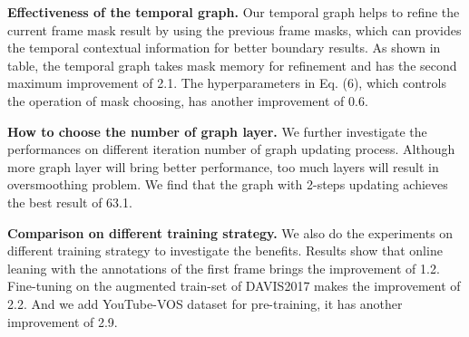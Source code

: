 \documentclass[letterpaper]{article} \usepackage{aaai21}  \usepackage{times}  \usepackage{helvet} \usepackage{courier}  \usepackage[hyphens]{url}  \usepackage{graphicx} \urlstyle{rm} \def\UrlFont{\rm}  \usepackage{graphicx}  \usepackage{natbib}  \usepackage{caption} \frenchspacing  \setlength{\pdfpagewidth}{8.5in}  \setlength{\pdfpageheight}{11in}  \usepackage{amsmath}
\begin{document}
\noindent \textbf{Effectiveness of the temporal graph.}
Our temporal graph helps to refine the current frame mask result by using the previous frame masks, which can provides the temporal contextual information for better boundary results. As shown in table,
the temporal graph takes mask memory for refinement and has the second maximum improvement of 2.1.  The hyperparameters  in Eq. (6), which controls the operation of mask choosing, has another improvement of 0.6.

\noindent \textbf{How to choose the number of graph layer.}
We further investigate the performances on different iteration number  of graph updating process. Although more graph layer will bring better performance, too much layers will result in oversmoothing problem. We find that the graph with 2-steps updating achieves the best result of 63.1.

\noindent \textbf{Comparison on different training strategy.}
We also do the experiments on different training strategy to investigate the benefits. Results show that online leaning with the annotations of the first frame brings the improvement of 1.2. Fine-tuning on the augmented train-set of DAVIS2017 makes the improvement of 2.2. And we add YouTube-VOS dataset for pre-training, it has another improvement of 2.9.
\end{document}
